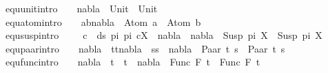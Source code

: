 \begin{isabellebody}
equ{\isacharunderscore}{\kern0pt}unit{\isacharbrackleft}{\kern0pt}intro{\isacharbang}{\kern0pt}{\isacharbrackright}{\kern0pt}{\isacharcolon}{\kern0pt}\ \ \ \ {\isachardoublequoteopen}{\isacharparenleft}{\kern0pt}nabla\ {\isasymturnstile}\ Unit\ {\isasymapprox}\ Unit{\isacharparenright}{\kern0pt}{\isachardoublequoteclose}\ {\isacharbar}{\kern0pt}\isanewline
equ{\isacharunderscore}{\kern0pt}atom{\isacharbrackleft}{\kern0pt}intro{\isacharbang}{\kern0pt}{\isacharbrackright}{\kern0pt}{\isacharcolon}{\kern0pt}\ \ \ \ {\isachardoublequoteopen}a{\isacharequal}{\kern0pt}b{\isasymLongrightarrow}nabla\ {\isasymturnstile}\ Atom\ a\ {\isasymapprox}\ Atom\ b{\isachardoublequoteclose}\ {\isacharbar}{\kern0pt}\isanewline
equ{\isacharunderscore}{\kern0pt}susp{\isacharbrackleft}{\kern0pt}intro{\isacharbang}{\kern0pt}{\isacharbrackright}{\kern0pt}{\isacharcolon}{\kern0pt}\ \ \ \ {\isachardoublequoteopen}{\isacharparenleft}{\kern0pt}{\isasymforall}\ c\ {\isasymin}\ ds\ pi{}\ pi{}{\isachardot}{\kern0pt}\ {\isacharparenleft}{\kern0pt}c{\isacharcomma}{\kern0pt}X{\isacharparenright}{\kern0pt}\ {\isasymin}\ nabla{\isacharparenright}{\kern0pt}\ {\isasymLongrightarrow}\ {\isacharparenleft}{\kern0pt}nabla\ {\isasymturnstile}\ Susp\ pi{}\ X\ {\isasymapprox}\ Susp\ pi{}\ X{\isacharparenright}{\kern0pt}{\isachardoublequoteclose}\ {\isacharbar}{\kern0pt}\isanewline
equ{\isacharunderscore}{\kern0pt}paar{\isacharbrackleft}{\kern0pt}intro{\isacharbang}{\kern0pt}{\isacharbrackright}{\kern0pt}{\isacharcolon}{\kern0pt}\ \ \ \ {\isachardoublequoteopen}{\isasymlbrakk}{\isacharparenleft}{\kern0pt}nabla\ {\isasymturnstile}\ t{}{\isasymapprox}t{}{\isacharparenright}{\kern0pt}{\isacharsemicolon}{\kern0pt}{\isacharparenleft}{\kern0pt}nabla\ {\isasymturnstile}\ s{}{\isasymapprox}s{}{\isacharparenright}{\kern0pt}{\isasymrbrakk}\ {\isasymLongrightarrow}\ {\isacharparenleft}{\kern0pt}nabla\ {\isasymturnstile}\ Paar\ t{}\ s{}\ {\isasymapprox}\ Paar\ t{}\ s{}{\isacharparenright}{\kern0pt}{\isachardoublequoteclose}\ {\isacharbar}{\kern0pt}\isanewline
equ{\isacharunderscore}{\kern0pt}func{\isacharbrackleft}{\kern0pt}intro{\isacharbang}{\kern0pt}{\isacharbrackright}{\kern0pt}{\isacharcolon}{\kern0pt}\ \ \ \ {\isachardoublequoteopen}{\isacharparenleft}{\kern0pt}nabla\ {\isasymturnstile}\ t{}\ {\isasymapprox}\ t{}{\isacharparenright}{\kern0pt}\ {\isasymLongrightarrow}\ {\isacharparenleft}{\kern0pt}nabla\ {\isasymturnstile}\ Func\ F\ t{}\ {\isasymapprox}\ Func\ F\ t{}{\isacharparenright}{\kern0pt}{\isachardoublequoteclose}\isanewline

\end{isabellebody}
